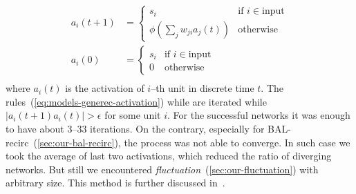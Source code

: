 \begin{align}
  \label{eq:models-generec-activation}
  a_i(t+1) &= \left\{
	\begin{array}{ll}
		s_i & \mbox{if } i \in \mbox{input} \nonumber \\
		\phi(\sum_j w_{ji}a_j(t)) & \mbox{otherwise} \nonumber 
	\end{array}
\right. \\
  a_i(0) &= \left\{
	\begin{array}{ll}
		s_i & \mbox{if } i \in \mbox{input} \nonumber \\
		0 & \mbox{otherwise} \nonumber
	\end{array}
\right. \\
\end{align} 
\label{sec:generec-fluctuation}
where $a_i(t)$ is the activation of $i$--th unit in discrete time $t$. The rules~(\ref{eq:models-generec-activation}) while are iterated while $|a_i(t+1) a_i(t)| > \epsilon$ for some unit $i$. For the successful networks it was enough to have about 3--33 iterations. On the contrary, especially for BAL-recirc~(\ref{sec:our-bal-recirc}), the process was not able to converge. In such case we took the average of last two activations, which reduced the ratio of diverging networks. But still we encountered \emph{fluctuation}~(\ref{sec:our-fluctuation}) with arbitrary size. This method is further discussed in~\citet{orru2008sabio}.

